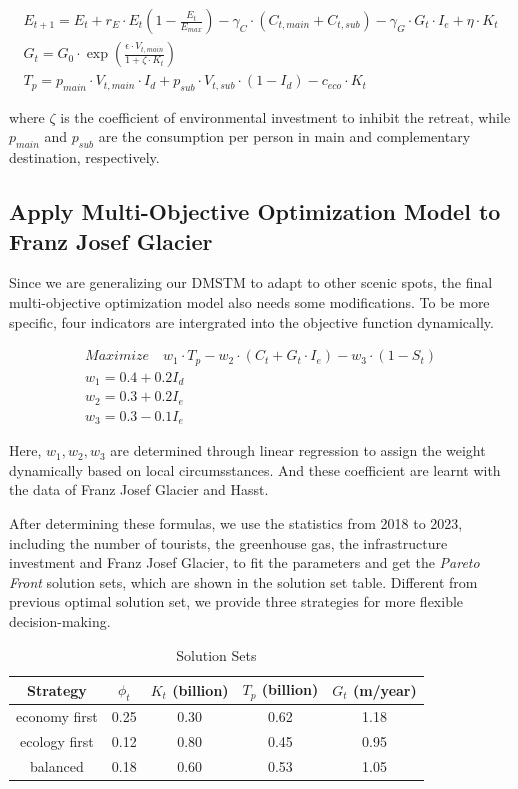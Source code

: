 \documentclass{mcmthesis}
\begin{document}
\begin{gather}
  E_{t+1} = E_t + r_E \cdot E_t \left(1 - \frac{E_t}{E_{max}}\right) - \gamma_C \cdot (C_{t,main} + C_{t,sub}) - \gamma_G \cdot G_t \cdot I_e + \eta \cdot K_t \\
  G_t = G_0 \cdot \exp \left(\frac{\epsilon \cdot V_{t,main}}{1+\zeta \cdot K_t}\right) \\
  T_p = p_{main} \cdot V_{t,main} \cdot I_d + p_{sub} \cdot V_{t,sub} \cdot (1 - I_d) - c_{eco} \cdot K_t
\end{gather}

where $\zeta$ is the coefficient of environmental investment to inhibit the retreat, while 
$p_{main}$ and $p_{sub}$ are the consumption per person in main and complementary destination, respectively.

\subsection{Apply Multi-Objective Optimization Model to Franz Josef Glacier}
Since we are generalizing our DMSTM to adapt to other scenic spots, the final multi-objective optimization model
also needs some modifications. To be more specific, four indicators are intergrated into the objective function dynamically.

\begin{gather}
  Maximize \quad w_1\cdot T_p - w_2 \cdot (C_t + G_t \cdot I_e) - w_3 \cdot (1 - S_t) \\ 
  w_1 = 0.4 + 0.2I_d \\
  w_2 = 0.3 + 0.2I_e \\
  w_3 = 0.3 - 0.1I_e
\end{gather}

Here, $w_1, w_2, w_3$ are determined through linear regression to assign the weight dynamically based on local circumsstances.
And these coefficient are learnt with the data of Franz Josef Glacier and Hasst. 

After determining these formulas, we use the statistics from 2018 to 2023, including the number of tourists, the greenhouse gas, 
the infrastructure investment and Franz Josef Glacier, to fit the parameters and get the \emph{Pareto Front} solution sets, which
are shown in the solution set table. Different from previous optimal solution set, we provide three strategies for more flexible 
decision-making.

\begin{table}[H]
  \caption{Solution Sets}    
  \centering
  \begin{tabular}{ccccc}
    \toprule
    Strategy & $\phi_t$ & $K_t$ (billion) & $T_p$ (billion) & $G_t$ (m/year) \\
    \midrule
    economy first & 0.25 & 0.30 & 0.62 & 1.18 \\
    ecology first & 0.12 & 0.80 & 0.45 & 0.95 \\
    balanced & 0.18 & 0.60 & 0.53 & 1.05 \\
    \bottomrule
  \end{tabular}
\end{table}
\end{document}
